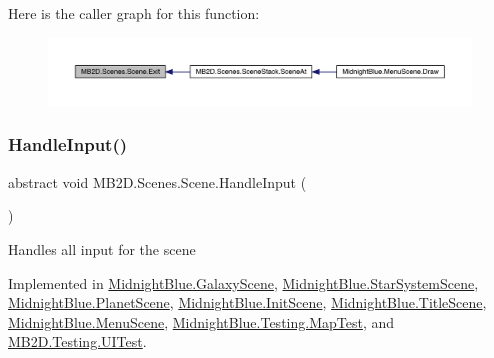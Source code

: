 Here is the caller graph for this function\+:
\nopagebreak
\begin{figure}[H]
\begin{center}
\leavevmode
\includegraphics[width=350pt]{class_m_b2_d_1_1_scenes_1_1_scene_a099b79e16d23b67349847999d2336813_icgraph}
\end{center}
\end{figure}
\hypertarget{class_m_b2_d_1_1_scenes_1_1_scene_a476de5a885408d27ff151044d20738c8}{}\label{class_m_b2_d_1_1_scenes_1_1_scene_a476de5a885408d27ff151044d20738c8} 
\subsubsection{\texorpdfstring{Handle\+Input()}{HandleInput()}}
{\footnotesize\ttfamily abstract void M\+B2\+D.\+Scenes.\+Scene.\+Handle\+Input (\begin{DoxyParamCaption}{ }\end{DoxyParamCaption})\hspace{0.3cm}{\ttfamily [pure virtual]}}



Handles all input for the scene 



Implemented in \hyperlink{class_midnight_blue_1_1_galaxy_scene_afd7f8c9f6d0cf6ded10299d4b0015c29}{Midnight\+Blue.\+Galaxy\+Scene}, \hyperlink{class_midnight_blue_1_1_star_system_scene_a9fd64901322082a4da8658650257163d}{Midnight\+Blue.\+Star\+System\+Scene}, \hyperlink{class_midnight_blue_1_1_planet_scene_a6c84a639f27b9f7510b514969d47d1bd}{Midnight\+Blue.\+Planet\+Scene}, \hyperlink{class_midnight_blue_1_1_init_scene_a4a8d9c22193d334e41685ce62fa11dd9}{Midnight\+Blue.\+Init\+Scene}, \hyperlink{class_midnight_blue_1_1_title_scene_a54dc02f150eb90dac2fcc6e37a077723}{Midnight\+Blue.\+Title\+Scene}, \hyperlink{class_midnight_blue_1_1_menu_scene_a34d30a2b66e9eadbf0889071bca6fa57}{Midnight\+Blue.\+Menu\+Scene}, \hyperlink{class_midnight_blue_1_1_testing_1_1_map_test_ad7e54e4aec415ccf6e89ce8a8876d259}{Midnight\+Blue.\+Testing.\+Map\+Test}, and \hyperlink{class_m_b2_d_1_1_testing_1_1_u_i_test_abfdabac63f2f6dd07e49c181ce84b24d}{M\+B2\+D.\+Testing.\+U\+I\+Test}.

